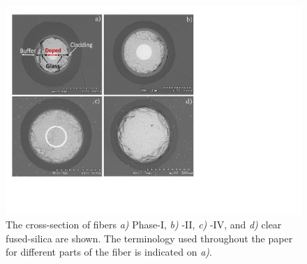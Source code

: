 \documentclass[a4paper,11pt]{article}
\begin{document}
\begin{figure}[ht]
\begin{center}\vspace{-1pc}
      \includegraphics[width=10 cm]{Figures/allfiberimage2.pdf}
\caption{\small The cross-section of fibers
{\it a)} Phase-I,
{\it b)} -II,
{\it c)} -IV, and
{\it d)} clear fused-silica are shown.  The terminology used throughout the paper for different parts of the fiber is indicated on {\it a)}.}
    \label{fig:FiberCrossSections}
\end{center}
\end{figure}
\end{document}
